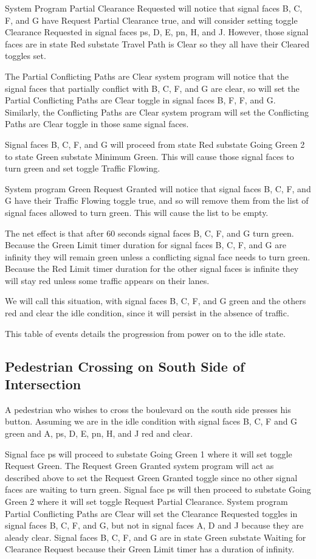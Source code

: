 \documentclass[letterpaper,twoside]{article}
\begin{document}
System Program Partial Clearance Requested will notice that signal faces
B, C, F, and G have Request Partial Clearance true,
and will consider setting toggle Clearance
Requested in signal faces ps, D, E, pn, H, and J.  However, those signal faces
are in state Red substate Travel Path is Clear so they all have their
Cleared toggles set.

The Partial Conflicting Paths are Clear system program will notice that the
signal faces that partially conflict with B, C, F, and G are clear,
so will set the
Partial Conflicting Paths are Clear toggle in signal faces B, F, F, and G.
Similarly, the Conflicting Paths are Clear system program will set
the Conflicting Paths are Clear toggle in those same signal faces.

Signal faces B, C, F, and G will proceed from state Red substate
Going Green 2 to state Green substate Minimum Green.
This will cause those signal faces to turn green and set toggle
Traffic Flowing.

System program Green Request Granted will notice that signal faces
B, C, F, and G have their Traffic Flowing toggle true,
and so will remove them from the list of signal faces allowed to turn green.
This will cause the list to be empty.

The net effect is that after 60 seconds signal faces
B, C, F, and G turn green.  Because the Green Limit timer duration for signal
faces B, C, F, and G are infinity they will remain green unless
a conflicting signal face needs to turn green.  Because the Red Limit
timer duration for the other signal faces is infinite they will stay red
unless some traffic appears on their lanes.

We will call this situation, with signal faces B, C, F, and G green
and the others red and clear the idle condition, since it will persist
in the absence of traffic.

This table of events details the progression from power on to the idle state.



\subsection{Pedestrian Crossing on South Side of Intersection}
A pedestrian who wishes to cross the boulevard on the south side
presses his button.  Assuming we are in the idle condition
with signal faces
B, C, F and G green and A, ps, D, E, pn, H, and J red and clear.

Signal face ps will proceed to substate Going Green 1 where it will set
toggle Request Green.  The Request Green Granted system program will act
as described above to set the Request Green Granted toggle since no other
signal faces are waiting to turn green.  Signal face ps will then
proceed to substate Going Green 2 where it will set toggle Request Partial
Clearance.  System program Partial Conflicting Paths are Clear will set
the Clearance Requested toggles in signal faces B, C, F, and G,
but not in signal faces A, D and J because they are aleady clear.
Signal faces B, C, F, and G are in state Green substate Waiting for Clearance
Request because their Green Limit timer has a duration of infinity.
\end{document}
